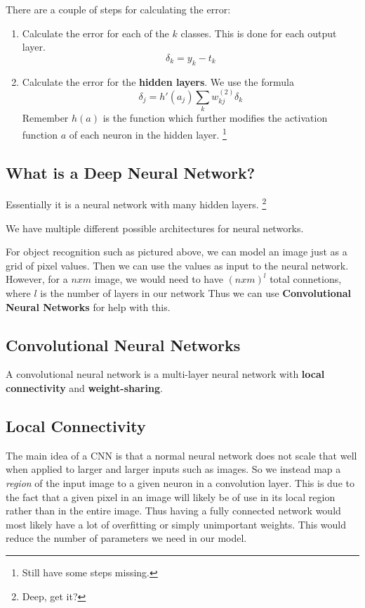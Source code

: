 \documentclass{tufte-handout}
\begin{document}
There are a couple of steps for calculating the error:
\begin{enumerate}
	\item Calculate the error for each of the $k$ classes. This is done for each output layer.
			\[ \delta_{k} = y_{k} - t_{k}\]
	\item Calculate the error for the \textbf{hidden layers}. We use the formula
			\[ \delta_{j} = h'(a_{j})\sum_{k}^{}w_{kj}^{(2)}\delta_{k}\]
				Remember $h(a)$ is the function which further modifies the activation function $a$ of
				each neuron in the hidden layer.
				\footnote{Still have some steps missing.}
\end{enumerate}
\subsection{What is a Deep Neural Network?}
Essentially it is a neural network with many hidden layers.
\footnote{Deep, get it?}

We have multiple different possible architectures for neural networks.
%

For object recognition such as pictured above, we can model an image just as a grid of pixel values.
Then we can use the values as input to the neural network. 
However, for a $n x m$ image, we would need to have $(n x m)^{l}$ total connetions, where $l$ is
	the number of layers in our network
Thus we can use \textbf{Convolutional Neural Networks} for help with this.

\subsection{Convolutional Neural Networks}
A convolutional neural network is a multi-layer neural network with \textbf{local connectivity}
	and \textbf{weight-sharing}.
	\subsection{Local Connectivity}
The main idea of a CNN is that a normal neural network does not scale that well when applied to
	larger and larger inputs such as images.
So we instead map a \textit{region} of the input image to a given neuron in a convolution layer.
This is due to the fact that a given pixel in an image will likely be of use in its local region rather
	than in the entire image. 
Thus having a fully connected network would most likely have a lot of overfitting or simply unimportant weights.
This would reduce the number of parameters we need in our model.
\end{document}
